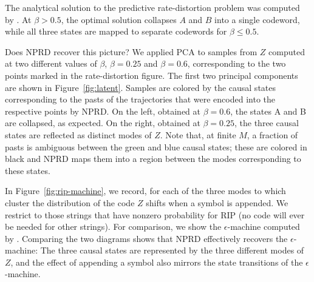 \documentclass[11pt,letterpaper]{article}
\newif \ifcomment
\newcommand\rljf[1]{\ifcomment{{\color{blue}(#1)}}\else{}\fi}
\begin{document}
The analytical solution to the predictive rate-distortion problem was computed by \cite{marzen-predictive-2016}.
At $\beta > 0.5$, the optimal solution collapses $A$ and $B$ into a single codeword, while all three states are mapped to separate codewords for $\beta \leq 0.5$.


Does NPRD recover this picture?
We applied PCA to samples from $Z$ computed at two different values of $\beta$, $\beta = 0.25$ and $\beta = 0.6$, corresponding to the two points marked in the rate-distortion figure.
The first two principal components are shown in Figure~\ref{fig:latent}.
Samples are colored by the causal states corresponding to the pasts of the trajectories that were encoded into the respective points by NPRD.
On the left, obtained at $\beta=0.6$, the states A and B are collapsed, as expected.
On the right, obtained at $\beta=0.25$, the three causal states are reflected as distinct modes of $Z$.
Note that, at finite $M$, a fraction of pasts is ambiguous between the green and blue causal states; these are colored in black and NPRD maps them into a region between the modes corresponding to these states.

In Figure~\ref{fig:rip-machine}, we record, for each of the three modes to which cluster the distribution of the code $Z$ shifts when a symbol is appended.
We restrict to those strings that have nonzero probability for RIP (no code will ever be needed for other strings).
For comparison, we show the $\epsilon$-machine computed by \cite{marzen-predictive-2016}.
Comparing the two diagrams shows that NPRD effectively recovers the $\epsilon$-machine:
The three causal states are represented by the three different modes of $Z$, and the effect of appending a symbol also mirrors the state transitions of the $\epsilon$-machine.
\end{document}
